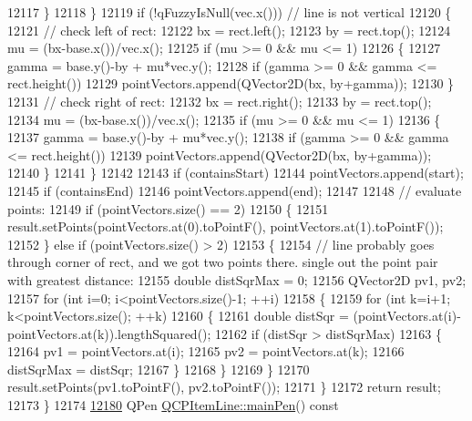 \begin{DoxyCode}
12117     \}
12118   \}
12119   \textcolor{keywordflow}{if} (!qFuzzyIsNull(vec.x())) \textcolor{comment}{// line is not vertical}
12120   \{
12121     \textcolor{comment}{// check left of rect:}
12122     bx = rect.left();
12123     by = rect.top();
12124     mu = (bx-base.x())/vec.x();
12125     \textcolor{keywordflow}{if} (mu >= 0 && mu <= 1)
12126     \{
12127       gamma = base.y()-by + mu*vec.y();
12128       \textcolor{keywordflow}{if} (gamma >= 0 && gamma <= rect.height())
12129         pointVectors.append(QVector2D(bx, by+gamma));
12130     \}
12131     \textcolor{comment}{// check right of rect:}
12132     bx = rect.right();
12133     by = rect.top();
12134     mu = (bx-base.x())/vec.x();
12135     \textcolor{keywordflow}{if} (mu >= 0 && mu <= 1)
12136     \{
12137       gamma = base.y()-by + mu*vec.y();
12138       \textcolor{keywordflow}{if} (gamma >= 0 && gamma <= rect.height())
12139         pointVectors.append(QVector2D(bx, by+gamma));
12140     \}
12141   \}
12142   
12143   \textcolor{keywordflow}{if} (containsStart)
12144     pointVectors.append(start);
12145   \textcolor{keywordflow}{if} (containsEnd)
12146     pointVectors.append(end);
12147   
12148   \textcolor{comment}{// evaluate points:}
12149   \textcolor{keywordflow}{if} (pointVectors.size() == 2)
12150   \{
12151     result.setPoints(pointVectors.at(0).toPointF(), pointVectors.at(1).toPointF());
12152   \} \textcolor{keywordflow}{else} \textcolor{keywordflow}{if} (pointVectors.size() > 2)
12153   \{
12154     \textcolor{comment}{// line probably goes through corner of rect, and we got two points there. single out the point pair
       with greatest distance:}
12155     \textcolor{keywordtype}{double} distSqrMax = 0;
12156     QVector2D pv1, pv2;
12157     \textcolor{keywordflow}{for} (\textcolor{keywordtype}{int} i=0; i<pointVectors.size()-1; ++i)
12158     \{
12159       \textcolor{keywordflow}{for} (\textcolor{keywordtype}{int} k=i+1; k<pointVectors.size(); ++k)
12160       \{
12161         \textcolor{keywordtype}{double} distSqr = (pointVectors.at(i)-pointVectors.at(k)).lengthSquared();
12162         \textcolor{keywordflow}{if} (distSqr > distSqrMax)
12163         \{
12164           pv1 = pointVectors.at(i);
12165           pv2 = pointVectors.at(k);
12166           distSqrMax = distSqr;
12167         \}
12168       \}
12169     \}
12170     result.setPoints(pv1.toPointF(), pv2.toPointF());
12171   \}
12172   \textcolor{keywordflow}{return} result;
12173 \}
12174 
\hypertarget{a00115_source_l12180}{}\hyperlink{a00036_a7b5bc4ebacb55774b87c91b308ca7912}{12180} QPen \hyperlink{a00036_a7b5bc4ebacb55774b87c91b308ca7912}{QCPItemLine::mainPen}()\textcolor{keyword}{ const}

\end{DoxyCode}
